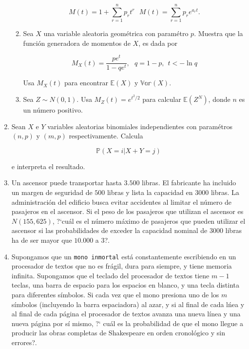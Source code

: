 \documentclass[a4paper,11pt]{report}
\begin{document}
\begin{enumerate}
\begin{enumerate}
	\[
	M(t) = 1 + \sum_{r = 1}^{n}p_rt^r \ \ \ M(t) = \sum_{r = 1}^{n}p_re^{a_rt}.
	\]
	\item Sea $X$ una variable aleatoria geom\'etrica con param\'etro $p$. Muestra que la funci\'on generadora de momentos de $X$, es dada por 
	
	\[
	M_X(t) = \frac{pe^t}{1 - qe^t}, \ \ \ q =  1 -p, \ \ t < -\ln q
	\]
	
	Usa $M_{X}(t)$ para encontrar $\mathbb{E}(X)$ y $\mathbb{Var}(X)$.
	
	\item Sea $Z \sim N(0,1)$. Usa $M_Z(t) = e^{t^2/2}$ para calcular $\mathbb{E}(Z^N)$, donde $n$ es un n\'umero positivo.
\end{enumerate}

\item Sean $X$ e $Y$ variables aleatorias binomiales independientes con param\'etros $(n , p)$ y $(m, p)$ respectivamente. Calcula

\[
\mathbb{P}( X = i | X + Y = j)
\]

e interpreta el resultado.

\item Un ascensor puede transportar hasta $3.500$ libras. El fabricante ha incluido un margen de seguridad de $500$ libras y  lista la capacidad  en $3000$ libras. La administraci\'on del edificio busca evitar accidentes al limitar el n\'umero de pasajeros en el ascensor. Si el peso de los pasajeros que utilizan el ascensor es $N(155, 625)$, ?`cu\'al es el n\'umero m\'aximo de pasajeros que pueden utilizar el ascensor si las probabilidades de exceder la capacidad nominal de $3000$  libras ha de ser mayor que $10.000$ a $3$?.



\item Supongamos que un \texttt{mono inmortal} est\'a constantemente escribiendo en un procesador de textos que no es fr\'agil, dura para siempre, y tiene memoria infinita. Supongamos que el teclado del procesador de textos tiene $m-1$ teclas, una barra de espacio para los espacios en blanco, y una tecla distinta para diferentes s\'imbolos. Si cada vez que el mono presiona uno de los $m$ s\'imbolos (incluyendo la barra espaciadora) al azar, y si al final de cada l\'nea y al final de cada p\'agina el  procesador de textos avanza  una nueva l\'inea y una nueva p\'agina por s\'i mismo, ?` cu\'al es la probabilidad de que el mono llegue  a producir las obras completas de Shakespeare en orden cronol\'ogico y sin errores?.


\end{enumerate}
\end{document}
